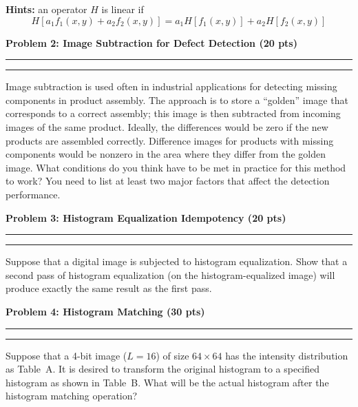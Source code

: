 \documentclass[12pt]{article}
\newcommand{\question}[1]{%
  \clearpage
  \vspace{0.5cm}
  {\noindent\normalsize \textbf{#1}}
  \vspace{0.2cm}
  \hrule
  \vspace{0.1cm}
  \hrule
  \vspace{0.3cm}
}
\begin{document}
\textbf{Hints:} an operator $H$ is linear if
\[
H[a_1 f_1(x,y) + a_2 f_2(x,y)] = a_1 H[f_1(x,y)] + a_2 H[f_2(x,y)]
\]



\question{Problem 2: Image Subtraction for Defect Detection (20 pts)}\label{quest:2}

Image subtraction is used often in industrial applications for detecting missing components in product assembly. The approach is to store a ``golden'' image that corresponds to a correct assembly; this image is then subtracted from incoming images of the same product. Ideally, the differences would be zero if the new products are assembled correctly. Difference images for products with missing components would be nonzero in the area where they differ from the golden image. What conditions do you think have to be met in practice for this method to work? You need to list at least two major factors that affect the detection performance.



\question{Problem 3: Histogram Equalization Idempotency (20 pts)}\label{quest:3}

Suppose that a digital image is subjected to histogram equalization. Show that a second pass of histogram equalization (on the histogram-equalized image) will produce exactly the same result as the first pass.



\question{Problem 4: Histogram Matching (30 pts)}\label{quest:4}

Suppose that a 4-bit image ($L=16$) of size $64 \times 64$ has the intensity distribution as Table~A. It is desired to transform the original histogram to a specified histogram as shown in Table~B. What will be the actual histogram after the histogram matching operation?

\vspace{0.5cm}
\end{document}
